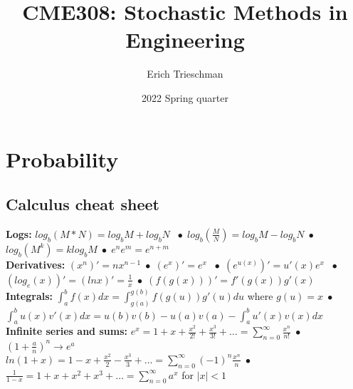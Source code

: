 \documentclass{article}
\title{CME308: Stochastic Methods in Engineering}
\author{Erich Trieschman}
\date{2022 Spring quarter}
\newcommand{\abs}[1]{\lvert#1\rvert}
\newcommand*\bspace{$\; \bullet \;$}
\begin{document}
\maketitle

\section{Probability}
\subsection{Calculus cheat sheet}
\textbf{Logs:} $log_b(M * N) = log_bM + log_bN$ \bspace $log_b(\frac{M}{N}) = log_bM - log_bN$\bspace $log_b(M^k) = klog_bM$\bspace $e^ne^m = e^{n+m}$\\
\textbf{Derivatives:} $(x^n)' = nx^{n-1}$\bspace $(e^x)' = e^x$ \bspace $(e^{u(x)})' = u'(x)e^x$ \bspace $(log_e(x))' = (lnx)' = \frac{1}{x}$\bspace $(f(g(x)))' = f'(g(x))g'(x)$\\
\textbf{Integrals: } $\int_a^b f(x)dx = \int_{g(a)}^{g(b)}f(g(u))g'(u)du$ where $g(u) = x$\bspace $\int_a^b u(x)v'(x)dx = u(b)v(b) - u(a)v(a) - \int_a^b u'(x)v(x)dx$\\
\textbf{Infinite series and sums:} $e^x = 1 + x + \frac{x^2}{2!} + \frac{x^3}{3!} + \dots = \sum_{n=0}^\infty \frac{x^n}{n!}$\bspace $(1 + \frac{a}{n})^n \longrightarrow e^a$\\
$ln(1 + x) = 1 - x + \frac{x^2}{2} - \frac{x^3}{3} + \dots = \sum_{n=0}^\infty (-1)^n\frac{x^n}{n}$\bspace $\frac{1}{1-x} = 1 + x + x^2 + x^3 + \dots = \sum_{n=0}^\infty a^x$ for $\abs{x} < 1$
\end{document}
